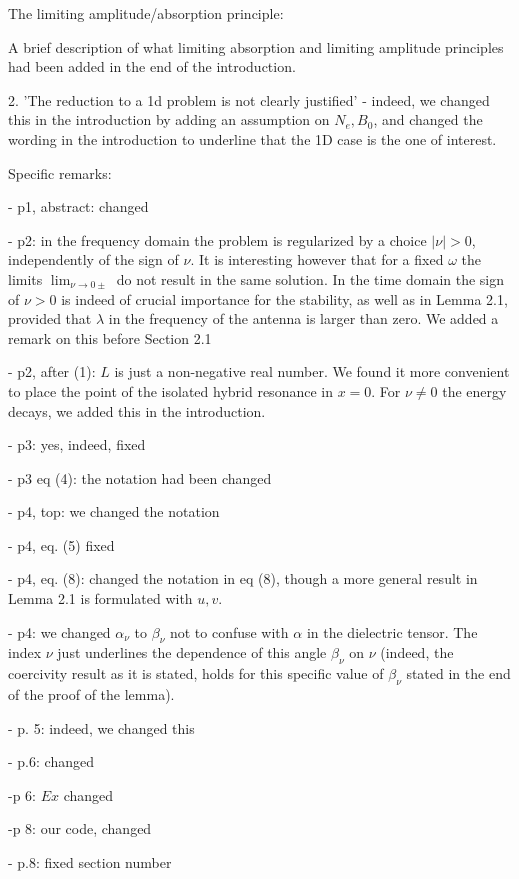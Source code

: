 \documentclass[a4paper,10pt]{article}
\begin{document}
The limiting amplitude/absorption principle: 

A brief description of what limiting absorption and limiting amplitude principles had been added in the end of the introduction.

2. 'The reduction to a 1d problem is not clearly justified' - indeed, we changed this in the introduction by adding an assumption on $N_e, B_0$, 
and changed the wording in the introduction to underline that the 1D case is the one of interest. 


Specific remarks: 

- p1, abstract: changed

- p2: in the frequency domain  the problem is regularized by a choice $|\nu|>0$, independently of the sign of $\nu$. 
It is interesting however that for a fixed $\omega$ the limits $\lim_{\nu\rightarrow 0\pm}$ do not result in the same solution. 
In the time domain the sign of $\nu>0$ is indeed of crucial importance for the stability, as well as in Lemma 2.1, provided that $\lambda$ in the 
frequency of the antenna is larger than zero. We added a remark on this before Section 2.1  

- p2, after (1): $L$ is just a non-negative real number. We found it more convenient to place the point of the isolated hybrid resonance in $x=0$.
For $\nu\neq 0$ the energy decays, we added this in the introduction.


- p3: yes, indeed, fixed

- p3 eq (4): the notation had been changed
  
- p4, top: we changed the notation 

- p4, eq. (5) fixed

- p4, eq. (8): changed the notation in eq (8), though a more general result in Lemma 2.1 is formulated with $u,v$. 

- p4: we changed $\alpha_{\nu}$ to $\beta_{\nu}$ not to confuse with $\alpha$ in the dielectric tensor. The index $\nu$ 
just underlines the dependence of this angle $\beta_{\nu}$ on $\nu$ (indeed, the coercivity result as it is stated, holds for this specific value of $\beta_{\nu}$ stated 
in the end of the proof of the lemma).

- p. 5: indeed, we changed this 

- p.6:  changed

-p 6: $Ex$ changed

-p 8: our code, changed

 - p.8: fixed section number
 
\end{document}
